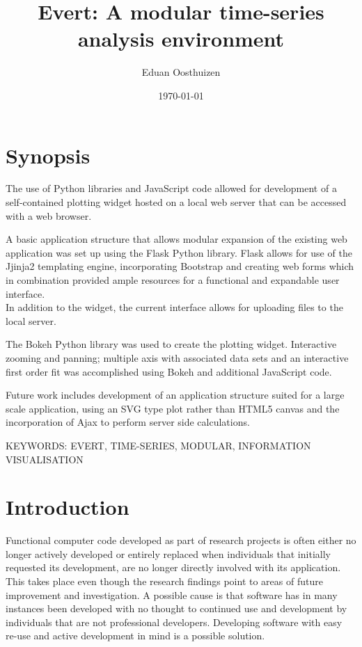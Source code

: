 \documentclass[a4paper,12pt]{article}
\title{Evert: A modular time-series analysis environment}
\author{Eduan Oosthuizen}
\date{\today}
\begin{document}
\maketitle
\makecoverpage

\pagestyle{plain}
\thispagestyle{plain}

\begin{center}
\LARGE\textbf{\thetitle}
\end{center}

\section*{Synopsis}
The use of Python libraries and JavaScript code allowed for development of a self-contained plotting widget hosted on a local web server that can be accessed with a web browser.

A basic application structure that allows modular expansion of the existing web application was set up using the Flask Python library. Flask allows for use of the Jjinja2 templating engine, incorporating Bootstrap and creating web forms which in combination provided ample resources for a functional and expandable user interface.\\In addition to the widget, the current interface allows for uploading files to the local server.

The Bokeh Python library was used to create the plotting widget. Interactive zooming and panning; multiple axis with associated data sets and an interactive first order fit was accomplished using Bokeh and additional JavaScript code.

Future work includes development of an application structure suited for a large scale application, using an SVG type plot rather than HTML5 canvas and the incorporation of Ajax to perform server side calculations.\newline

\noindent KEYWORDS: EVERT, TIME-SERIES, MODULAR, INFORMATION VISUALISATION

\newpage
\tableofcontents
\newpage
\listoffigures
\newpage
\printnomenclature
\newpage

\pagestyle{plain}
\setcounter{page}{1}

\section{Introduction}
Functional computer code developed as part of research projects is often either no longer actively developed or entirely replaced when individuals that initially requested its development, are no longer directly involved with its application. This takes place even though the research findings point to areas of future improvement and investigation.
A possible cause is that software has in many instances been developed with no thought to continued use and development by individuals that are not professional developers. Developing software with easy re-use and active development in mind is a possible solution.
\end{document}
